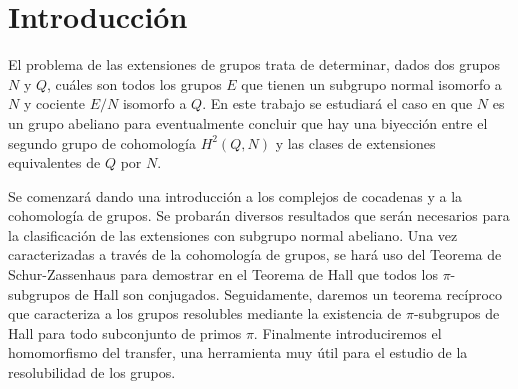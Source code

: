 
\chapter{Introducción}

El problema de las extensiones de grupos trata de determinar, dados dos grupos $N$ y $Q$, cuáles son todos los grupos $E$ que tienen un subgrupo normal isomorfo a $N$ y cociente $E/N$ isomorfo a $Q$. En este trabajo se estudiará el caso en que $N$ es un grupo abeliano para eventualmente concluir que hay una biyección entre el segundo grupo de cohomología $H^2(Q,N)$ y las clases de extensiones equivalentes de $Q$ por $N$.



Se comenzará dando una introducción a los complejos de cocadenas y a la cohomología de grupos. Se probarán diversos resultados que serán necesarios para la clasificación de las extensiones con subgrupo normal abeliano. Una vez caracterizadas a través de la cohomología de grupos, se hará uso del Teorema de Schur-Zassenhaus para demostrar en el Teorema de Hall que todos los $\pi$-subgrupos de Hall son conjugados. Seguidamente, daremos un teorema recíproco que caracteriza a los grupos resolubles mediante la existencia de $\pi$-subgrupos de Hall para todo subconjunto de primos $\pi$. Finalmente introduciremos el homomorfismo del transfer, una herramienta muy útil para el estudio de la resolubilidad de los grupos.